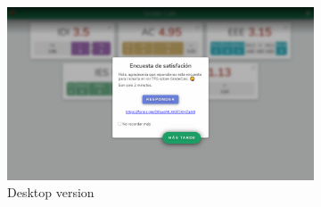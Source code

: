 \vfill
\begin{figure}[ht!]
    \begin{subfigure}[b]{0.757\textwidth-0.1cm}
        \centering
        \includegraphics[width=\textwidth]{media/screenshots/screenshot-survey-pc.png}
        \caption{Desktop version}
    \end{subfigure}
    \hfill
    \begin{subfigure}[b]{0.243\textwidth-0.1cm}
        \centering

\end{subfigure}
\end{figure}
